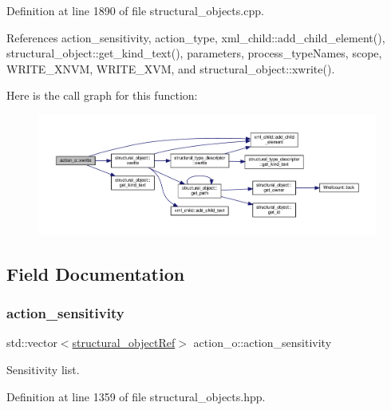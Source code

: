 Definition at line 1890 of file structural\+\_\+objects.\+cpp.



References action\+\_\+sensitivity, action\+\_\+type, xml\+\_\+child\+::add\+\_\+child\+\_\+element(), structural\+\_\+object\+::get\+\_\+kind\+\_\+text(), parameters, process\+\_\+type\+Names, scope, W\+R\+I\+T\+E\+\_\+\+X\+N\+VM, W\+R\+I\+T\+E\+\_\+\+X\+VM, and structural\+\_\+object\+::xwrite().

Here is the call graph for this function\+:
\nopagebreak
\begin{figure}[H]
\begin{center}
\leavevmode
\includegraphics[width=350pt]{d2/ded/classaction__o_ace0907025534f0523c2f322a24f36ac8_cgraph}
\end{center}
\end{figure}


\subsection{Field Documentation}
\mbox{\label{classaction__o_a5a9283625cb49b748d6f59f30b19d447}} 
\subsubsection{\texorpdfstring{action\+\_\+sensitivity}{action\_sensitivity}}
{\footnotesize\ttfamily std\+::vector$<$\hyperlink{structural__objects_8hpp_a8ea5f8cc50ab8f4c31e2751074ff60b2}{structural\+\_\+object\+Ref}$>$ action\+\_\+o\+::action\+\_\+sensitivity\hspace{0.3cm}{\ttfamily [private]}}



Sensitivity list. 



Definition at line 1359 of file structural\+\_\+objects.\+hpp.



